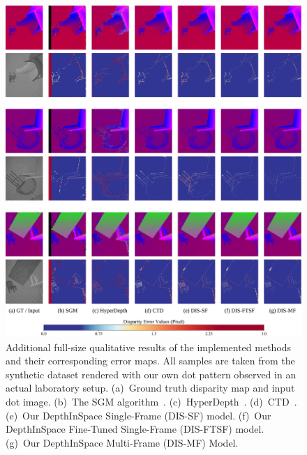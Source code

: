 \begin{figure}
    \begin{center}
        \includegraphics[width=1\linewidth]{images/chapter2/supp_figures/supp_results_3.jpg}
    \end{center}
   \caption{Additional full-size qualitative results of the implemented methods and their corresponding error maps. All samples are taken from the synthetic dataset rendered with our own dot pattern observed in an actual laboratory setup. (a)~Ground truth disparity map and input dot image. (b)~The SGM algorithm~\cite{hirschmuller2007stereo}. (c)~HyperDepth~\cite{ryan2016hyperdepth}. (d)~CTD~\cite{riegler2019connecting}. (e)~Our DepthInSpace Single-Frame (DIS-SF) model. (f)~Our DepthInSpace Fine-Tuned Single-Frame (DIS-FTSF) model. (g)~Our DepthInSpace Multi-Frame (DIS-MF) Model.}
    \label{fig:c2_actual_results}
\end{figure}

